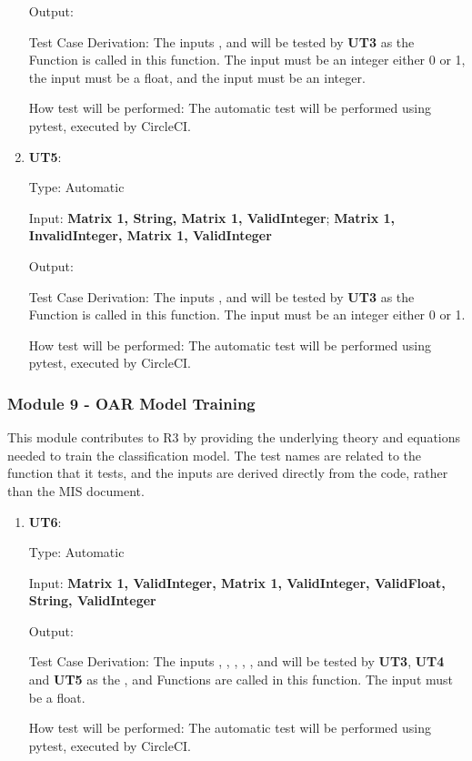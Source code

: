 \documentclass[12pt, titlepage]{article}
\begin{document}
\begin{enumerate}
Output: 

Test Case Derivation: The inputs ,  and  will be tested by \textbf{UT3} as the  Function is called in this function. 
The input  must be an integer either 0 or 1, the input  must be a float, and the input  must be an integer.

How test will be performed: The automatic test will be performed using pytest, executed by CircleCI.

\item{\textbf{UT5}: }

Type: Automatic
					
Input: \textbf{Matrix 1, String, Matrix 1, ValidInteger}; \textbf{Matrix 1, InvalidInteger, Matrix 1, ValidInteger}
					
Output: 

Test Case Derivation: The inputs ,  and  will be tested by \textbf{UT3} as the  Function is called in this function. 
The input  must be an integer either 0 or 1.

How test will be performed: The automatic test will be performed using pytest, executed by CircleCI.
\end{enumerate}

\subsubsection{Module 9 - OAR Model Training}
This module contributes to R3 by providing the underlying theory and equations needed to train the classification model.
The test names are related to the function that it tests, and the inputs are derived directly from the code, rather than the MIS document.

\begin{enumerate}

  \item{\textbf{UT6}:}

  Type: Automatic
            
  Input: \textbf{Matrix 1, ValidInteger, Matrix 1, ValidInteger, ValidFloat, String, ValidInteger}
            
  Output: 
  
  Test Case Derivation: The inputs , , , , , and  will be tested by \textbf{UT3}, \textbf{UT4} and \textbf{UT5} as the ,  and  Functions are called in this function. 
  The input  must be a float.
  
  How test will be performed: The automatic test will be performed using pytest, executed by CircleCI.

\end{enumerate}
\end{document}
